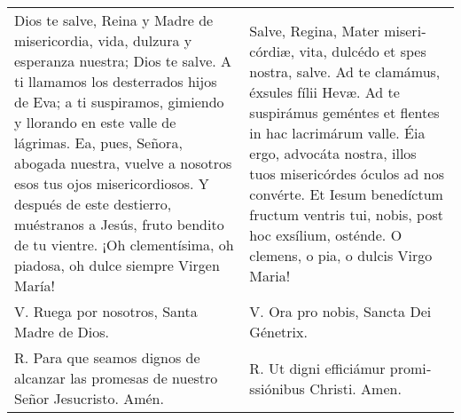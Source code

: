 \documentclass[../devocionario.tex]{subfiles}
\begin{document}
    \begin{longtable} { p{} p{} }
        Dios te salve, Reina y Madre de mi­se­ri­cordia, vida, dulzura y esperanza nuestra; Dios te salve. 
        A ti llamamos los desterrados hijos de Eva; a ti suspiramos, gimiendo y llorando en este valle de lágrimas. 
        Ea, pues, Señora, abogada nuestra, vuelve a nosotros esos tus ojos mi­se­ri­cordiosos. Y después de este destierro, muéstranos a Jesús, 
        fruto bendito de tu vientre. ¡Oh cle­men­tísima, oh piadosa, oh dulce siempre Virgen María! &
        Salve, Regina, Mater mi­se­ri­córdiæ, vita, dulcédo et spes nostra, salve. Ad te clamámus, éxsules fílii Hevæ. 
        Ad te suspirámus geméntes et flentes in hac lacrimárum valle. Éia ergo, advocáta nostra, illos tuos mi­se­ri­córdes óculos ad nos convérte. 
        Et Iesum benedíctum fructum ventris tui, nobis, post hoc exsílium, osténde. O clemens, o pia, o dulcis Virgo Maria!\\
        
        V. Ruega por nosotros, Santa Madre de Dios. & V. Ora pro nobis, Sancta Dei Génetrix.\\
        
        R. Para que seamos dignos de alcanzar las promesas de nuestro Señor Jesucristo. Amén. & 
        R. Ut digni efficiámur pro­mi­ssiónibus Christi. Amen.
    \end{longtable}
\end{document}
